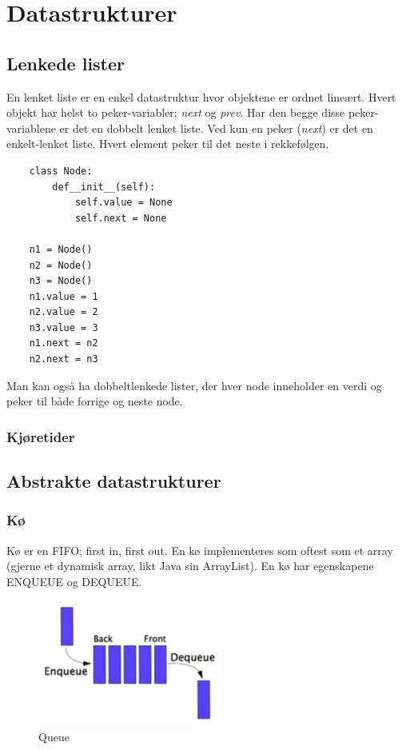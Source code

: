 \section{Datastrukturer}

\subsection{Lenkede lister}
En lenket liste er en enkel datastruktur hvor objektene er ordnet lineært. Hvert objekt har helst to peker-variabler; \textit{next} og \textit{prev}. Har den begge disse peker-variablene er det en dobbelt lenket liste. Ved kun en peker (\textit{next}) er det en enkelt-lenket liste. Hvert element peker til det neste i rekkefølgen.

\begin{lstlisting}
    class Node:
    	def__init__(self):
    		self.value = None
    		self.next = None
    
    n1 = Node()
    n2 = Node()
    n3 = Node()
    n1.value = 1
    n2.value = 2
    n3.value = 3
    n1.next = n2
    n2.next = n3
\end{lstlisting}

\noindent Man kan også ha dobbeltlenkede lister, der hver node inneholder en verdi og peker til både forrige og neste node.

\subsubsection{Kjøretider}


\subsection{Abstrakte datastrukturer}

\subsubsection{Kø}
Kø er en FIFO; first in, first out. En kø implementeres som oftest som et array (gjerne et dynamisk array, likt Java sin ArrayList). En kø har egenskapene ENQUEUE og DEQUEUE. 

\begin{figure}[H]
\includegraphics[scale=0.7]{images/ko}
\centering %
\caption{Queue}
\label{fig:ko}
\end{figure}

